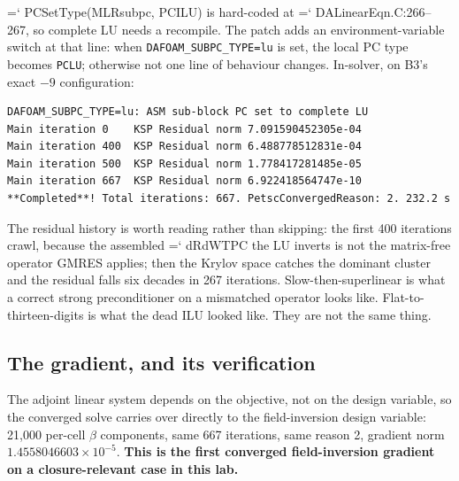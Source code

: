 \documentclass[11pt,a4paper]{article}
\newcommand{\artifact}[1]{{\small\ttfamily\hyphenchar\font=`\-\relax
  \def\_{\textunderscore\allowbreak}#1}}
\begin{document}
\artifact{PCSetType(MLRsubpc, PCILU)} is hard-coded at \artifact{DALinearEqn.C:266--267}, so
complete LU needs a recompile. The patch adds an environment-variable switch at that line:
when \texttt{DAFOAM\_SUBPC\_TYPE=lu} is set, the local PC type becomes \texttt{PCLU};
otherwise not one line of behaviour changes. In-solver, on B3's exact \(-9\) configuration:

\begin{lstlisting}
DAFOAM_SUBPC_TYPE=lu: ASM sub-block PC set to complete LU
Main iteration 0    KSP Residual norm 7.091590452305e-04
Main iteration 400  KSP Residual norm 6.488778512831e-04
Main iteration 500  KSP Residual norm 1.778417281485e-05
Main iteration 667  KSP Residual norm 6.922418564747e-10
**Completed**! Total iterations: 667. PetscConvergedReason: 2. 232.2 s
\end{lstlisting}

The residual history is worth reading rather than skipping: the first 400 iterations crawl,
because the assembled \artifact{dRdWTPC} the LU inverts is not the matrix-free operator GMRES
applies; then the Krylov space catches the dominant cluster and the residual falls six decades
in 267 iterations. Slow-then-superlinear is what a correct strong preconditioner on a
mismatched operator looks like. Flat-to-thirteen-digits is what the dead ILU looked like.
They are not the same thing.

\subsection{The gradient, and its verification}

The adjoint linear system depends on the objective, not on the design variable, so the
converged solve carries over directly to the field-inversion design variable: 21{,}000
per-cell \(\beta\) components, same 667 iterations, same reason 2, gradient norm
\(1.4558046603\times10^{-5}\). \textbf{This is the first converged field-inversion gradient on
a closure-relevant case in this lab.}
\end{document}
